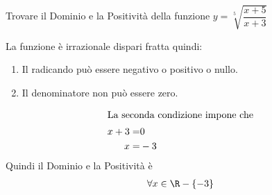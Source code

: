 	Trovare il Dominio e la Positività della funzione $y=\sqrt[5]{\dfrac{x+5}{x+3}}$
	
	La funzione è irrazionale dispari fratta quindi:
	\begin{enumerate}
		\item Il radicando può essere negativo o positivo o nullo.
		\item Il denominatore non può essere zero.
	\end{enumerate}
	\begin{align*}
	\intertext{La seconda condizione impone che}
	x+3=&0\\
	x=&-3
	\end{align*}
	Quindi il Dominio e la Positività è
	\begin{align*}
	\forall x\in\R-\lbrace-3&\rbrace\\
	\end{align*}
